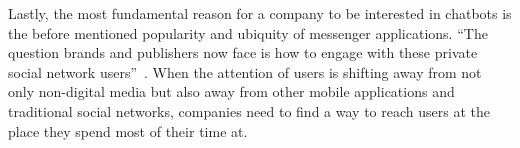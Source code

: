 Lastly, the most fundamental reason for a company to be interested in chatbots is the before mentioned popularity and ubiquity of messenger applications.
``The question brands and publishers now face is how to engage with these private social network users''~\cite{drum}.
When the attention of users is shifting away from not only non-digital media but also away from other mobile applications
and traditional social networks, companies need to find a way to reach users at the place they spend most of their time at.
